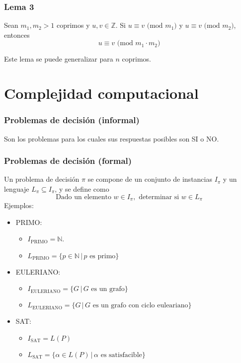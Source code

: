 \begin{multicols}{2}
    \subsubsection*{Lema 3}
    Sean $m_1,m_2 > 1$ coprimos y $u,v \in \mathbb{Z}$. Si $u \equiv v \text{ (mod } m_1)$ y $u \equiv v \text{ (mod } m_2)$, entonces 
    $$u \equiv v \text{ (mod } m_1 \cdot m_2)$$
    
    Este lema se puede generalizar para $n$ coprimos.
    
    \section{Complejidad computacional}
    \subsubsection*{Problemas de decisión (informal)}
    Son los problemas para los cuales sus respuestas posibles son SI o NO.
    
    \subsubsection*{Problemas de decisión (formal)}
    Un problema de decisión $\pi$ se compone de un conjunto de instancias $I_\pi$ y un lenguaje $L_\pi \subseteq I_\pi$, y se define como
    $$
    \text{Dado un elemento } w \in I_\pi, \text{ determinar si } w \in L_\pi
    $$
    Ejemplos:
    \begin{itemize}
        \item PRIMO:
        \begin{itemize}
            \item $I_{\text{PRIMO}} = \mathbb{N}$.
            \item $L_{\text{PRIMO}} = \{ p \in \mathbb{N} \,|\, p \text{ es primo}\}$
        \end{itemize}
        \item EULERIANO:
        \begin{itemize}
            \item $I_{\text{EULERIANO}} = \{ G \,|\, G \text{ es un grafo} \}$
            \item $L_{\text{EULERIANO}} = \{ G \,|\, G \text{ es un grafo con ciclo euleariano} \}$
        \end{itemize}
        \item SAT:
        \begin{itemize}
            \item $I_{\text{SAT}} = L(P)$
            \item $L_{\text{SAT}} = \{ \alpha \in L(P) \,|\, \alpha \text{ es satisfacible} \}$
        \end{itemize}
    \end{itemize}
    

\end{multicols}
